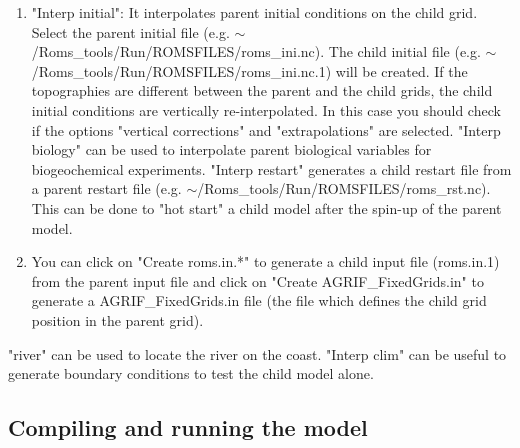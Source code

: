 \begin{enumerate}
\item "Interp initial": It interpolates parent initial
conditions on the child grid. Select the parent initial file
(e.g. $\sim$/Roms\_tools/Run/ROMSFILES/roms\_ini.nc).
The child initial file 
(e.g. $\sim$/Roms\_tools/Run/ROMSFILES/roms\_ini.nc.1) 
will be created.
If the topographies are different between the parent and 
the child grids, the child initial conditions are 
vertically re-interpolated. In this case you should check 
if the options "vertical corrections" and "extrapolations"
are selected.
"Interp biology" can be used to interpolate
parent biological variables for biogeochemical experiments.
"Interp restart" generates a child restart file from 
a parent restart file 
(e.g. $\sim$/Roms\_tools/Run/ROMSFILES/roms\_rst.nc). 
This can be done to "hot start" a child model after the 
spin-up of the parent model.

\item You can click on "Create roms.in.*" to generate a
child input file (roms.in.1) from the parent input
file and click on "Create AGRIF\_FixedGrids.in" to 
generate a AGRIF\_FixedGrids.in file (the file which
defines the child grid position in the parent grid).

\end{enumerate}

"river" can be used to locate the river on the coast.
"Interp clim" can be useful to generate boundary conditions 
to test the child model alone. 

\subsection{Compiling and running the model}

